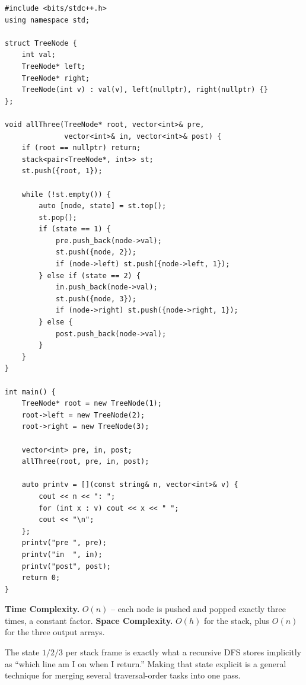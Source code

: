 \begin{lstlisting}
#include <bits/stdc++.h>
using namespace std;

struct TreeNode {
    int val;
    TreeNode* left;
    TreeNode* right;
    TreeNode(int v) : val(v), left(nullptr), right(nullptr) {}
};

void allThree(TreeNode* root, vector<int>& pre,
              vector<int>& in, vector<int>& post) {
    if (root == nullptr) return;
    stack<pair<TreeNode*, int>> st;
    st.push({root, 1});

    while (!st.empty()) {
        auto [node, state] = st.top();
        st.pop();
        if (state == 1) {
            pre.push_back(node->val);
            st.push({node, 2});
            if (node->left) st.push({node->left, 1});
        } else if (state == 2) {
            in.push_back(node->val);
            st.push({node, 3});
            if (node->right) st.push({node->right, 1});
        } else {
            post.push_back(node->val);
        }
    }
}

int main() {
    TreeNode* root = new TreeNode(1);
    root->left = new TreeNode(2);
    root->right = new TreeNode(3);

    vector<int> pre, in, post;
    allThree(root, pre, in, post);

    auto printv = [](const string& n, vector<int>& v) {
        cout << n << ": ";
        for (int x : v) cout << x << " ";
        cout << "\n";
    };
    printv("pre ", pre);
    printv("in  ", in);
    printv("post", post);
    return 0;
}
\end{lstlisting}

\begin{complexitybox}
\textbf{Time Complexity.} $O(n)$ -- each node is pushed and popped exactly
three times, a constant factor. \textbf{Space Complexity.} $O(h)$ for the
stack, plus $O(n)$ for the three output arrays.
\end{complexitybox}

\begin{takeawaybox}
The state $1/2/3$ per stack frame is exactly what a recursive DFS stores
implicitly as ``which line am I on when I return.'' Making that state
explicit is a general technique for merging several traversal-order tasks
into one pass.
\end{takeawaybox}
